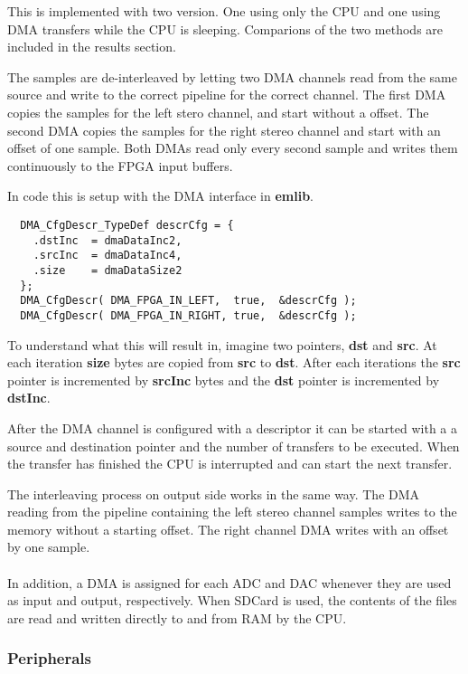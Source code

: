 This is implemented with two version. One using only the CPU and one using DMA transfers
while the CPU is sleeping. Comparions of the two methods are included in the results section.

The samples are de-interleaved by letting two DMA channels read from the same
source and write to the correct pipeline for the correct channel. The first DMA
copies the samples for the left stero channel, and start without a offset. The
second DMA copies the samples for the right stereo channel and start with an
offset of one sample. Both DMAs read only every second sample and writes them
continuously to the FPGA input buffers.

In code this is setup with the DMA interface in {\bf emlib}. 
\begin{lstlisting}
  DMA_CfgDescr_TypeDef descrCfg = {
    .dstInc  = dmaDataInc2,
    .srcInc  = dmaDataInc4,
    .size    = dmaDataSize2
  };
  DMA_CfgDescr( DMA_FPGA_IN_LEFT,  true,  &descrCfg );
  DMA_CfgDescr( DMA_FPGA_IN_RIGHT, true,  &descrCfg );
\end{lstlisting}
To understand what this will result in, imagine two pointers, {\bf dst} and {\bf src}. 
At each iteration {\bf size} bytes are copied from {\bf src} to {\bf dst}. After each
iterations the {\bf src} pointer is incremented by {\bf srcInc} bytes and the {\bf dst}
pointer is incremented by {\bf dstInc}. 

After the DMA channel is configured with a descriptor it can be started with a 
a source and destination pointer and the number of transfers to be executed. 
When the transfer has finished the CPU is interrupted and can start the next transfer.

The interleaving process on output side works in the same way. The DMA reading
from the pipeline containing the left stereo channel samples writes to the
memory without a starting offset. The right channel DMA writes with an offset by
one sample.

\paragraph{}
In addition, a DMA is assigned for each ADC and DAC whenever they are used as
input and output, respectively. When SDCard is used, the contents of the files
are read and written directly to and from RAM by the CPU.


\subsubsection{Peripherals}

